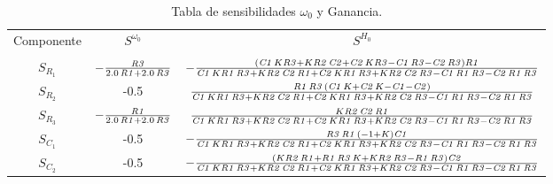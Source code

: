 \begin{table}[H]
\centering
\begin{tabular}{ccc}
Componente & $S^{\omega_0}$ & $S^{H_0}$ \\ \cline{1-3}\\
$S_{R_1}$  & $-{\frac {{\it R3}}{ 2.0\,{\it R1}+ 2.0\,{\it R3}}}$    &$ -{\frac { \left( {\it C1}\,K{\it R3}+K{\it R2}\,{\it C2}+{\it C2}\,K{
\it R3}-{\it C1}\,{\it R3}-{\it C2}\,{\it R3} \right) {\it R1}}{{\it 
C1}\,K{\it R1}\,{\it R3}+K{\it R2}\,{\it C2}\,{\it R1}+{\it C2}\,K{
\it R1}\,{\it R3}+K{\it R2}\,{\it C2}\,{\it R3}-{\it C1}\,{\it R1}\,{
\it R3}-{\it C2}\,{\it R1}\,{\it R3}}} $  \\
$S_{R_2}$  & -0.5    & ${\frac {{\it R1}\,{\it R3}\, \left( {\it C1}\,K+{\it C2}\,K-{\it C1}-{
\it C2} \right) }{{\it C1}\,K{\it R1}\,{\it R3}+K{\it R2}\,{\it C2}\,{
\it R1}+{\it C2}\,K{\it R1}\,{\it R3}+K{\it R2}\,{\it C2}\,{\it R3}-{
\it C1}\,{\it R1}\,{\it R3}-{\it C2}\,{\it R1}\,{\it R3}}}$   \\
$S_{R_3}$  & $-{\frac {{\it R1}}{ 2.0\,{\it R1}+ 2.0\,{\it R3}}}$     & ${\frac {K{\it R2}\,{\it C2}\,{\it R1}}{{\it C1}\,K{\it R1}\,{\it R3}+K
{\it R2}\,{\it C2}\,{\it R1}+{\it C2}\,K{\it R1}\,{\it R3}+K{\it R2}\,
{\it C2}\,{\it R3}-{\it C1}\,{\it R1}\,{\it R3}-{\it C2}\,{\it R1}\,{
\it R3}}}$   \\
$S_{C_1}$  & -0.5    & $-{\frac {{\it R3}\,{\it R1}\, \left( -1+K \right) {\it C1}}{{\it C1}\,
K{\it R1}\,{\it R3}+K{\it R2}\,{\it C2}\,{\it R1}+{\it C2}\,K{\it R1}
\,{\it R3}+K{\it R2}\,{\it C2}\,{\it R3}-{\it C1}\,{\it R1}\,{\it R3}-
{\it C2}\,{\it R1}\,{\it R3}}}$  \\
$S_{C_2}$  & -0.5    & $-{\frac { \left( K{\it R2}\,{\it R1}+{\it R1}\,{\it R3}\,K+K{\it R2}\,
{\it R3}-{\it R1}\,{\it R3} \right) {\it C2}}{{\it C1}\,K{\it R1}\,{
\it R3}+K{\it R2}\,{\it C2}\,{\it R1}+{\it C2}\,K{\it R1}\,{\it R3}+K{
\it R2}\,{\it C2}\,{\it R3}-{\it C1}\,{\it R1}\,{\it R3}-{\it C2}\,{
\it R1}\,{\it R3}}}$ 
\end{tabular}
\caption{Tabla de sensibilidades $\omega_0$ y Ganancia.}
\end{table}
